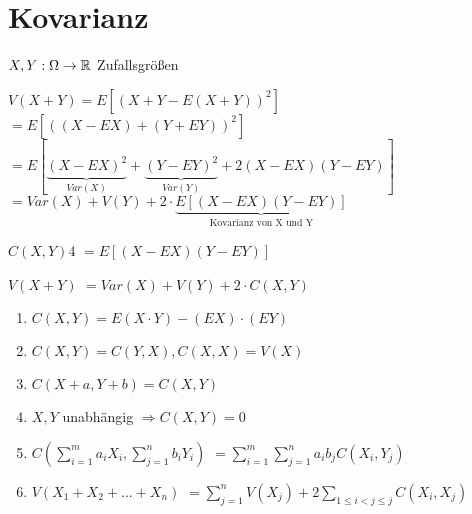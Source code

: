 \renewcommand{\ldate}{2015-12-08}

\section{Kovarianz}

$ X,Y: \Omega \rightarrow \mathbb{R} $ Zufallsgrößen

$ V(X+Y) = E[(X+Y - E(X+Y))^2]$
$=E[((X-EX) + (Y+EY))^2]$
$=E[\underbrace{(X-EX)^2}_{Var(X)} + \underbrace{(Y-EY)^2}_{Var(Y)} + 2 (X-EX)(Y-EY)]$
$=Var(X) + V(Y) + 2 \cdot \underbrace{E[(X-EX)(Y-EY)]}_{\textrm{Kovarianz von X und Y}}$ 

\begin{defi}
$C(X,Y) 4$
$=E[(X-EX)(Y-EY)]$

$V(X + Y)$
$=Var(X) + V(Y) + 2 \cdot C(X,Y)$
\end{defi}

\begin{satz}
\begin{enumerate}
\item $C(X,Y) = E(X\cdot Y) - (EX) \cdot (EY)$
\item $C(X,Y) = C(Y,X), C(X,X) = V(X)$
\item $ C(X+a, Y+b) = C(X,Y)$
\item $X,Y$ unabhängig $\Rightarrow C(X,Y) = 0$
\item $C(\sum_{i=1}^{m} a_i X_i, \sum_{j=1}^{n} b_i Y_i) $
$=\sum_{i=1}^{m} \sum_{j=1}^{n} a_i b_j C(X_i, Y_j)$
\item $V(X_1 + X_2 + ... + X_n)$
$= \sum_{j=1}^{n} V(X_j) + 2 \sum_{1\leq i < j \leq j} C(X_i, X_j)$
\end{enumerate}
\end{satz}

